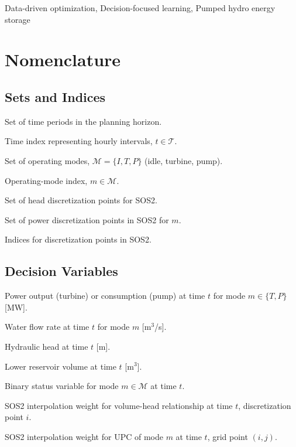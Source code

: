 \documentclass[journal]{IEEEtran}
\begin{document}
\begin{IEEEkeywords}
Data-driven optimization, Decision-focused learning, Pumped hydro energy storage \end{IEEEkeywords}

\section*{Nomenclature}

\subsection*{Sets and Indices}
\begin{IEEEdescription}
\item[$\mathcal{T}$] Set of time periods in the planning horizon.
\item[$t$] Time index representing hourly intervals, $t \in \mathcal{T}$.
\item[$\mathcal{M}$] Set of operating modes, $\mathcal{M} = \{I, T, P\}$ (idle, turbine, pump).
\item[$m$] Operating-mode index, $m \in \mathcal{M}$.
\item[$\mathcal{I}_h$] Set of head discretization points for SOS2.
\item[$\mathcal{I}_p^m$] Set of power discretization points in SOS2 for $m$.
\item[$i, j$] Indices for discretization points in SOS2.
\end{IEEEdescription}

\subsection*{Decision Variables}
\begin{IEEEdescription}
\item[$p_t^m$] Power output (turbine) or consumption (pump) at time $t$ for mode $m \in \{T, P\}$ [MW].
\item[$q_t^m$] Water flow rate at time $t$ for mode $m$ [m$^3$/s].
\item[$h_t$] Hydraulic head at time $t$ [m].
\item[$v_{\text{low},t}$] Lower reservoir volume at time $t$ [m$^3$].
\item[$z_t^m$] Binary status variable for mode $m \in \mathcal{M}$ at time $t$.
\item[$\Omega_{t,i}^{\text{vh}}$] SOS2 interpolation weight for volume-head relationship at time $t$, discretization point $i$.
\item[$\Omega_{t,i,j}^m$] SOS2 interpolation weight for UPC of mode $m$ at time $t$, grid point $(i,j)$.
\end{IEEEdescription}
\end{document}
